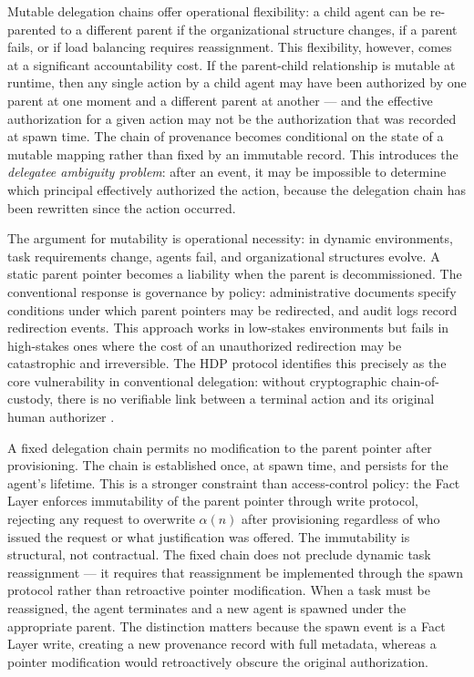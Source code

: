 Mutable delegation chains offer operational flexibility: a child agent can be re-parented to a different parent if the organizational structure changes, if a parent fails, or if load balancing requires reassignment. This flexibility, however, comes at a significant accountability cost. If the parent-child relationship is mutable at runtime, then any single action by a child agent may have been authorized by one parent at one moment and a different parent at another --- and the effective authorization for a given action may not be the authorization that was recorded at spawn time. The chain of provenance becomes conditional on the state of a mutable mapping rather than fixed by an immutable record. This introduces the \emph{delegatee ambiguity problem}: after an event, it may be impossible to determine which principal effectively authorized the action, because the delegation chain has been rewritten since the action occurred.

The argument for mutability is operational necessity: in dynamic environments, task requirements change, agents fail, and organizational structures evolve. A static parent pointer becomes a liability when the parent is decommissioned. The conventional response is governance by policy: administrative documents specify conditions under which parent pointers may be redirected, and audit logs record redirection events. This approach works in low-stakes environments but fails in high-stakes ones where the cost of an unauthorized redirection may be catastrophic and irreversible. The HDP protocol identifies this precisely as the core vulnerability in conventional delegation: without cryptographic chain-of-custody, there is no verifiable link between a terminal action and its original human authorizer \cite{hdp-draft,hdp-draft-2}.

A fixed delegation chain permits no modification to the parent pointer after provisioning. The chain is established once, at spawn time, and persists for the agent's lifetime. This is a stronger constraint than access-control policy: the Fact Layer enforces immutability of the parent pointer through write protocol, rejecting any request to overwrite $\alpha(n)$ after provisioning regardless of who issued the request or what justification was offered. The immutability is structural, not contractual. The fixed chain does not preclude dynamic task reassignment --- it requires that reassignment be implemented through the spawn protocol rather than retroactive pointer modification. When a task must be reassigned, the agent terminates and a new agent is spawned under the appropriate parent. The distinction matters because the spawn event is a Fact Layer write, creating a new provenance record with full metadata, whereas a pointer modification would retroactively obscure the original authorization.

